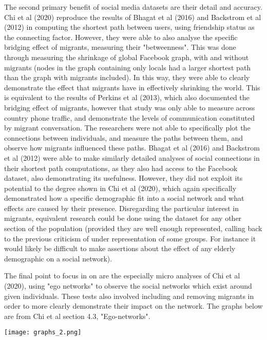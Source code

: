 \documentclass[12pt]{article}
\begin{document}
The second primary benefit of social media datasets are their detail and accuracy. Chi et al (2020) 
reproduce the results of Bhagat et al (2016) and Backstrom et al (2012) in computing 
the shortest path between users, using friendship status as the connecting factor. However, 
they were able to also analyse the specific bridging effect of migrants, measuring their 
"betweenness". This was done through measuring the shrinkage of global Facebook graph, 
with and without migrants (nodes in the graph containing only locals had a larger shortest 
path than the graph with migrants included). In this way, they were able to clearly 
demonstrate the effect that migrants have in effectively shrinking the world. This 
is equivalent to the results of Perkins et al (2013), which also documented the 
bridging effect of migrants, however that study was only able to measure across country 
phone traffic, and demonstrate the levels of communication constituted by migrant conversation.
The researchers were not able to specifically plot the connections between individuals, and 
measure the paths between them, and observe how migrants influenced these paths. Bhagat et al (2016) 
and Backstrom et al (2012) were able to make similarly detailed analyses of social connections 
in their shortest path computations, as they also had access to the Facebook dataset, 
also demonstrating its usefulness. However, they did not exploit its potential to the 
degree shown in Chi et al (2020), which again specifically demonstrated how a specific 
demographic fit into a social network and what effects are caused by their presence. Disregarding 
the particular interest in migrants, equivalent research could be done using the dataset 
for any other section of the population (provided they are well enough represented, calling 
back to the previous criticism of under representation of some groups. For instance it would 
likely be difficult to make assertions about the effect of any elderly demographic on a social network). 

The final point to focus in on are the especially micro analyses of Chi et al (2020), using 
"ego networks" to observe the social networks which exist around given individuals. These tests 
also involved including and removing migrants in order to more clearly demonstrate their 
impact on the network. The graphs below are from Chi et al section 4.3, "Ego-networks".

\texttt{[image: graphs\_2.png]}
\end{document}
